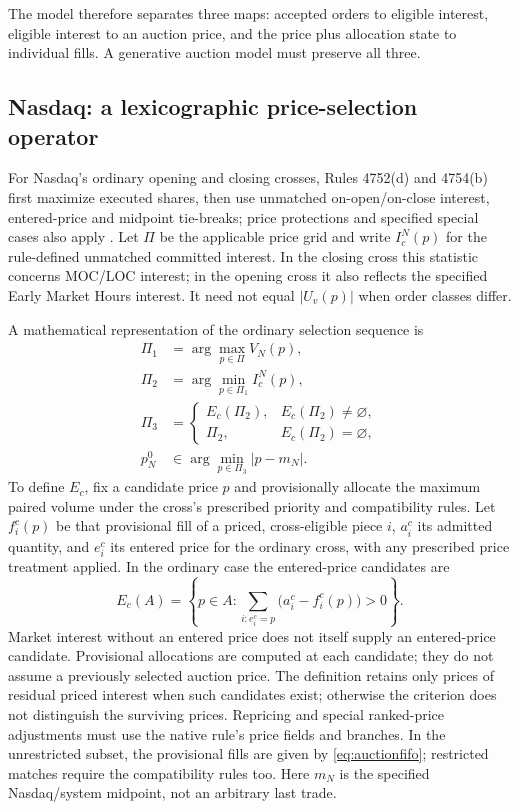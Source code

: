 \documentclass[11pt]{article}
\numberwithin{equation}{section}
\theoremstyle{definition}
\theoremstyle{remark}
\theoremstyle{definition}
\begin{document}
The model therefore separates three maps: accepted orders to eligible interest,
eligible interest to an auction price, and the price plus allocation state to
individual fills. A generative auction model must preserve all three.

\subsection{Nasdaq: a lexicographic price-selection operator}

For Nasdaq's ordinary opening and closing crosses, Rules 4752(d) and 4754(b)
first maximize executed shares, then use unmatched on-open/on-close interest,
entered-price and midpoint tie-breaks; price protections and specified special
cases also apply \citep{nasdaqrules}. Let $\Pi$ be the applicable price grid and
write $I_c^N(p)$ for the rule-defined unmatched committed interest. In the
closing cross this statistic concerns MOC/LOC interest; in the opening cross
it also reflects the specified Early Market Hours interest. It need not equal
$|U_v(p)|$ when order classes differ.

A mathematical representation of the ordinary selection sequence is
\begin{align}\label{eq:nasdaqlex}
 \Pi_1&=\arg\max_{p\in\Pi}V_N(p),\\
 \Pi_2&=\arg\min_{p\in\Pi_1}I_c^N(p),\nonumber\\
 \Pi_3&=\begin{cases}E_c(\Pi_2),&E_c(\Pi_2)\ne\varnothing,\\\Pi_2,&E_c(\Pi_2)=\varnothing,\end{cases}\nonumber\\
 p_N^0&\in\arg\min_{p\in\Pi_3}|p-m_N|.\nonumber
\end{align}
To define $E_c$, fix a candidate price $p$ and provisionally allocate the
maximum paired volume under the cross's prescribed priority and compatibility
rules. Let $f_i^c(p)$ be that provisional fill of a priced, cross-eligible
piece $i$, $a_i^c$ its admitted quantity, and $e_i^c$ its entered price for
the ordinary cross, with any prescribed price treatment applied. In the
ordinary case the entered-price candidates are
\begin{equation}\label{eq:enteredset}
 E_c(A)=\left\{p\in A:
   \sum_{i:e_i^c=p}\bigl(a_i^c-f_i^c(p)\bigr)>0\right\}.
\end{equation}
Market interest without an entered price does not itself supply an entered-price
candidate. Provisional allocations are computed at each candidate; they do not
assume a previously selected auction price. The definition retains only prices
of residual priced interest when such candidates exist; otherwise the criterion
does not distinguish the surviving prices. Repricing and special ranked-price
adjustments must use the native rule's price fields and branches. In the
unrestricted subset, the provisional fills are given by
\eqref{eq:auctionfifo}; restricted matches require the compatibility rules too.
Here $m_N$ is the specified Nasdaq/system midpoint, not an arbitrary last trade.
\end{document}
